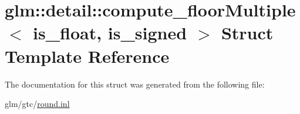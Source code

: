 \hypertarget{structglm_1_1detail_1_1compute__floorMultiple}{\section{glm\-:\-:detail\-:\-:compute\-\_\-floor\-Multiple$<$ is\-\_\-float, is\-\_\-signed $>$ Struct Template Reference}
\label{structglm_1_1detail_1_1compute__floorMultiple}
}


The documentation for this struct was generated from the following file\-:\begin{DoxyCompactItemize}
\item 
glm/gtc/\hyperlink{round_8inl}{round.\-inl}\end{DoxyCompactItemize}
